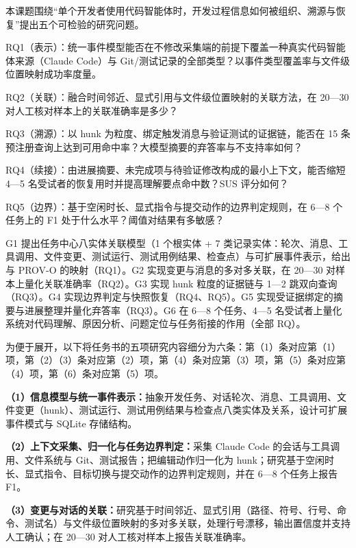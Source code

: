 

本课题围绕“单个开发者使用代码智能体时，开发过程信息如何被组织、溯源与恢复”提出五个可检验的研究问题。

RQ1（表示）：统一事件模型能否在不修改采集端的前提下覆盖一种真实代码智能体来源（Claude Code）与 Git/测试记录的全部类型？以事件类型覆盖率与文件级位置映射成功率度量。

RQ2（关联）：融合时间邻近、显式引用与文件级位置映射的关联方法，在 20—30 对人工核对样本上的关联准确率是多少？

RQ3（溯源）：以 hunk 为粒度、绑定触发消息与验证测试的证据链，能否在 15 条预注册查询上达到可用命中率？大模型摘要的弃答率与不支持率如何？

RQ4（续接）：由进展摘要、未完成项与待验证修改构成的最小上下文，能否缩短 4—5 名受试者的恢复用时并提高理解要点命中数？SUS 评分如何？

RQ5（边界）：基于空闲时长、显式指令与提交动作的边界判定规则，在 6—8 个任务上的 F1 处于什么水平？阈值对结果有多敏感？


G1 提出任务中心八实体关联模型（1 个根实体 + 7 类记录实体：轮次、消息、工具调用、文件变更、测试运行、测试用例结果、检查点）与可扩展事件表示，给出与 PROV-O 的映射（RQ1）。G2 实现变更与消息的多对多关联，在 20—30 对样本上量化关联准确率（RQ2）。G3 实现 hunk 粒度的证据链与 1—2 跳双向查询（RQ3）。G4 实现边界判定与快照恢复（RQ4、RQ5）。G5 实现受证据绑定的摘要与进展整理并量化弃答率（RQ3）。G6 在 6—8 个任务、4—5 名受试者上量化系统对代码理解、原因分析、问题定位与任务衔接的作用（全部 RQ）。


为便于展开，以下将任务书的五项研究内容细分为六条：第（1）条对应第（1）项，第（2）（3）条对应第（2）项，第（4）条对应第（3）项，第（5）条对应第（4）项，第（6）条对应第（5）项。

\textbf{（1）信息模型与统一事件表示：}抽象开发任务、对话轮次、消息、工具调用、文件变更（hunk）、测试运行、测试用例结果与检查点八类实体及关系，设计可扩展事件模式与 SQLite 存储结构。

\textbf{（2）上下文采集、归一化与任务边界判定：}采集 Claude Code 的会话与工具调用、文件系统与 Git、测试报告；把编辑动作归一化为 hunk；研究基于空闲时长、显式指令、目标切换与提交动作的边界判定规则，并在 6—8 个任务上报告 F1。

\textbf{（3）变更与对话的关联：}研究基于时间邻近、显式引用（路径、符号、行号、命令、测试名）与文件级位置映射的多对多关联，处理行号漂移，输出置信度并支持人工确认；在 20—30 对人工核对样本上报告关联准确率。

